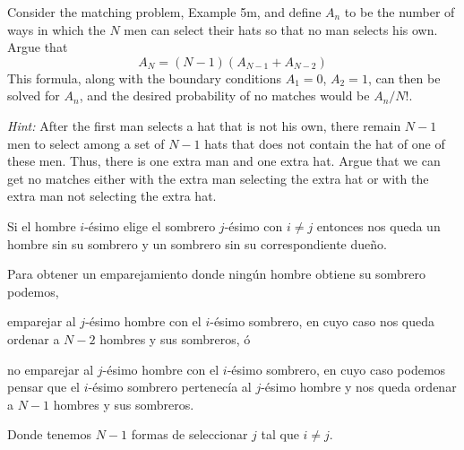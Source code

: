 \item Consider the matching problem, Example 5m, and define $A_n$ to be the number of ways in which the $N$ men can select their hats so that no man selects his own. Argue that
\[ A_N = (N-1) (A_{N-1} + A_{N-2}) \]
This formula, along with the boundary conditions $A_1 = 0$, $A_2 = 1$, can then be solved for $A_n$, and the desired probability of no matches would be $A_n/N!$.

\emph{Hint:} After the first man selects a hat that is not his own, there remain $N - 1$ men to select among a set of $N - 1$ hats that does not contain the hat of one of these men. Thus, there is one extra man and one extra hat. Argue that we can get no matches either with the extra man selecting the extra hat or with the extra man not selecting the extra hat.

Si el hombre $i$-ésimo elige el sombrero $j$-ésimo con $i \ne j$ entonces nos queda un hombre sin su sombrero y un sombrero sin su correspondiente dueño.

Para obtener un emparejamiento donde ningún hombre obtiene su sombrero podemos,

emparejar al $j$-ésimo hombre con el $i$-ésimo sombrero, en cuyo caso nos queda ordenar a $N-2$ hombres y sus sombreros, ó

no emparejar al $j$-ésimo hombre con el $i$-ésimo sombrero, en cuyo caso podemos pensar que el $i$-ésimo sombrero pertenecía al $j$-ésimo hombre y nos queda ordenar a $N-1$ hombres y sus sombreros.

Donde tenemos $N-1$ formas de seleccionar $j$ tal que $i \ne j$.